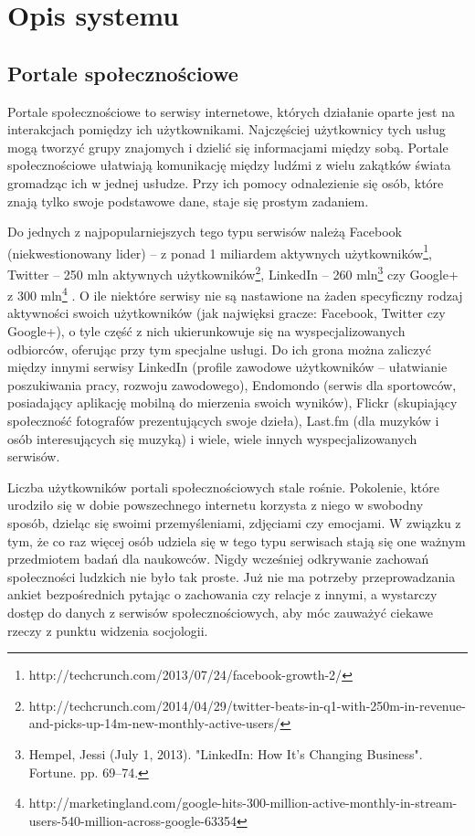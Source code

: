 \chapter{Opis systemu}
\label{chap:opisSystemu}
\section{Portale społecznościowe}
Portale społecznościowe to serwisy internetowe, których działanie oparte jest na
interakcjach pomiędzy ich użytkownikami. Najczęściej użytkownicy tych usług mogą
tworzyć grupy znajomych i dzielić się informacjami między sobą. Portale
społecznościowe ułatwiają komunikację między ludźmi z wielu zakątków świata
gromadząc ich w jednej usłudze. Przy ich pomocy odnalezienie się osób, które
znają tylko swoje podstawowe dane, staje się prostym zadaniem.

Do jednych z najpopularniejszych tego typu serwisów należą Facebook
(niekwestionowany lider) -- z ponad 1 miliardem aktywnych
użytkowników\footnote{http://techcrunch.com/2013/07/24/facebook-growth-2/},
Twitter -- 250 mln aktywnych
użytkowników\footnote{http://techcrunch.com/2014/04/29/twitter-beats-in-q1-with-250m-in-revenue-and-picks-up-14m-new-monthly-active-users/},
LinkedIn -- 260 mln\footnote{Hempel, Jessi (July 1, 2013). "LinkedIn: How It's
Changing Business". Fortune. pp. 69–74.} czy Google+ z 300
mln\footnote{http://marketingland.com/google-hits-300-million-active-monthly-in-stream-users-540-million-across-google-63354}
. O ile niektóre serwisy nie są nastawione na żaden specyficzny rodzaj
aktywności swoich użytkowników (jak najwięksi gracze: Facebook, Twitter czy
Google+), o tyle część z nich ukierunkowuje się na wyspecjalizowanych odbiorców,
oferując przy tym specjalne usługi. Do ich grona można zaliczyć między innymi
serwisy LinkedIn (profile zawodowe użytkowników -- ułatwianie poszukiwania
pracy, rozwoju zawodowego), Endomondo (serwis dla sportowców, posiadający
aplikację mobilną do mierzenia swoich wyników), Flickr (skupiający społeczność
fotografów prezentujących swoje dzieła), Last.fm (dla muzyków i osób
interesujących się muzyką) i wiele, wiele innych wyspecjalizowanych serwisów.

Liczba użytkowników portali społecznościowych stale rośnie. Pokolenie, które
urodziło się w dobie powszechnego internetu korzysta z niego w swobodny sposób,
dzieląc się swoimi przemyśleniami, zdjęciami czy emocjami. W związku z tym, że
co raz więcej osób udziela się w tego typu serwisach stają się one ważnym
przedmiotem badań dla naukowców. Nigdy wcześniej odkrywanie zachowań
społeczności ludzkich nie było tak proste. Już nie ma potrzeby przeprowadzania
ankiet bezpośrednich pytając o zachowania czy relacje z innymi, a wystarczy
dostęp do danych z serwisów społecznościowych, aby móc zauważyć ciekawe rzeczy z
punktu widzenia socjologii.

